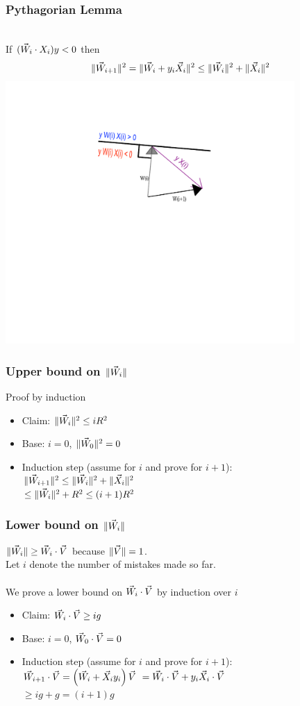 \documentclass[handout]{beamer}
\begin{document}
\begin{frame}
\frametitle{Pythagorian Lemma}
~\\
If $(\vec{W}_i \cdot X_i) y <0$ then\\
\pause
\[
\| \vec{W}_{i+1} \|^2 = \|\vec{W}_i + y_i \vec{X}_i\|^2 \leq \|\vec{W}_i\|^2 + \|\vec{X}_i\|^2 
\]
\pause
\includegraphics[height=10cm]{PerceptronAnim/PerceptronError.pdf}
\end{frame}

\begin{frame}
\frametitle{Upper bound on $\| \vec{W}_i \|$}
\pause
Proof by induction
\begin{itemize}
\item Claim: $ \| \vec{W}_{i} \|^2 \leq i R^2 $
\item Base: $i=0$, $\|\vec{W}_0\|^2 = 0$
\item Induction step (assume for $i$ and prove for $i+1$):\\
$ \| \vec{W}_{i+1} \|^2 \leq \|\vec{W}_i\|^2 + \|\vec{X}_i\|^2 $ \\
$\leq \|\vec{W}_i\|^2 + R^2 \leq (i+1) R^2$

\end{itemize}
\end{frame}

\begin{frame}
\frametitle{Lower bound on $\| \vec{W}_i \|$}
\pause
$\|\vec{W}_i\| \geq \vec{W}_{i} \cdot \vec{V}$ because $\| \vec{V} \|=1$.\\
\pause
Let $i$ denote the number of mistakes made so far.\\~\\
\pause
We prove a lower bound on $\vec{W}_{i} \cdot \vec{V}$ by induction over $i$
\begin{itemize}
\item Claim: $ \vec{W}_{i} \cdot \vec{V} \geq i g $
\item Base: $i=0$, $\vec{W}_0 \cdot \vec{V} = 0$
\item Induction step (assume for $i$ and prove for $i+1$):\\
$ \vec{W}_{i+1} \cdot \vec{V}  = \left( \vec{W}_i + \vec{X}_i y_i \right) \vec{V}$
\pause
$= \vec{W}_i \cdot \vec{V} + y_i \vec{X}_i \cdot \vec{V}$ \\
$\geq i g + g = (i+1) g$
\end{itemize}
\end{frame}
\end{document}
